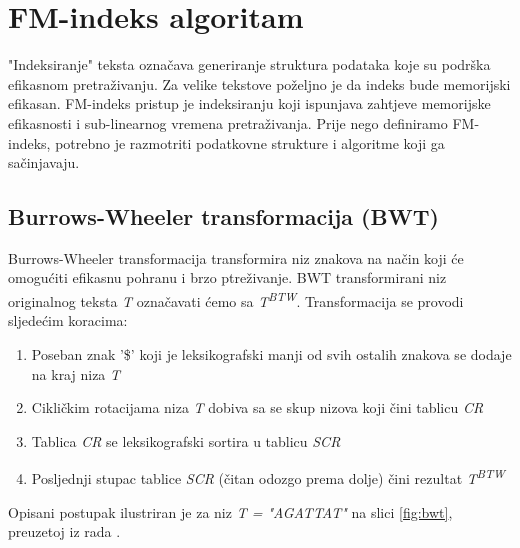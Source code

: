 \documentclass[times, utf8, seminar, numeric]{fer}
\begin{document}
\chapter{FM-indeks algoritam}

"Indeksiranje" teksta označava generiranje struktura podataka koje su podrška efikasnom
pretraživanju. Za velike tekstove poželjno je da indeks bude memorijski efikasan.
FM-indeks \cite{Ferragina00opportunisticdata} pristup je indeksiranju koji ispunjava
zahtjeve memorijske efikasnosti i sub-linearnog vremena pretraživanja. Prije nego definiramo
FM-indeks, potrebno je razmotriti podatkovne strukture i algoritme koji ga sačinjavaju.

\section{Burrows-Wheeler transformacija (BWT)}

Burrows-Wheeler transformacija \cite{btw_1994} transformira niz znakova na način koji
će omogućiti efikasnu pohranu i brzo ptreživanje. BWT transformirani niz originalnog
teksta \textit{T} označavati ćemo sa \textit{T\textsuperscript{BTW}}. Transformacija se provodi sljedećim koracima:

\begin{enumerate}
  \item{Poseban znak '\$' koji je leksikografski manji od svih ostalih znakova se dodaje na kraj niza \textit{T}}
  \item{Cikličkim rotacijama niza \textit{T} dobiva sa se skup nizova koji čini tablicu \textit{CR} }
  \item{Tablica \textit{CR} se leksikografski sortira u tablicu \textit{SCR}}
  \item{Posljednji stupac tablice \textit{SCR} (čitan odozgo prema dolje) čini rezultat \textit{T\textsuperscript{BTW}}}
\end{enumerate}

Opisani postupak ilustriran je za niz \textit{T = "AGATTAT"} na slici \ref{fig:bwt}, preuzetoj iz rada
\cite{singer_2012}.
\end{document}
